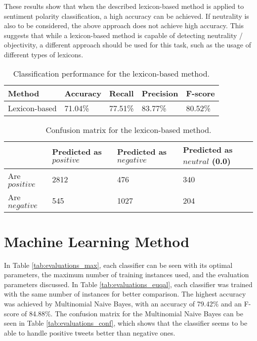 These results show that when the described lexicon-based method is applied to sentiment polarity classification, a high accuracy can be achieved. If neutrality is also to be considered, the above approach does not achieve high accuracy. This suggests that while a lexicon-based method is capable of detecting neutrality / objectivity, a different approach should be used for this task, such as the usage of different types of lexicons.

\begin{table}
\caption{Classification performance for the lexicon-based method.}
\label{tab:eval_lex}
\centering
\begin{tabular}{ |p{3cm}||p{2cm}|p{2cm}|p{2cm}|p{2cm}|}
 \hline
 Method &          Accuracy &      Recall &     Precision& F-score \\
  \hline
 Lexicon-based & 71.04\% & 77.51\% & 83.77\% & 80.52\% \\
 \hline
 \end{tabular}
 
\end{table}
\begin{table}
\centering
\caption{Confusion matrix for the lexicon-based method.}
\begin{tabular}{ |p{3cm}||p{3cm}|p{3cm}|p{3cm}| }
 \hline
  &          Predicted as $positive$ &Predicted as $negative$  & Predicted as $neutral$ (0.0)\\
 \hline
 Are $positive$        & 2812&            476 & 340\\
  \hline
 Are $negative$  &545&                     1027 & 204\\
 \hline

\end{tabular}
\label{tab:evaluations_conf_lex}
\end{table}



\section{Machine Learning Method}


In Table \ref{tab:evaluations_max}, each classifier can be seen with its optimal parameters, the maximum number of training instances used, and the evaluation parameters discussed. In Table \ref{tab:evaluations_euqal}, each classifier was trained with the same number of instances for better comparison. The highest accuracy was achieved by Multinomial Naive Bayes, with an accuracy of 79.42\% and an F-score of 84.88\%. The confusion matrix for the Multinomial Naive Bayes can be seen in Table \ref{tab:evaluations_conf}, which shows that the classifier seems to be able to handle positive tweets better than negative ones.

